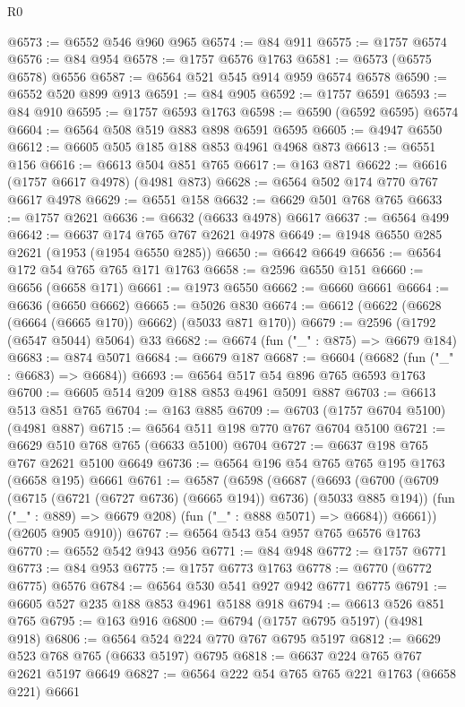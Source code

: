 \begin{lexlean}{R0}
\begin{coremodule}
{{{{{@6573 := @6552 @546 @960 @965
@6574 := @84 @911
@6575 := @1757 @6574
@6576 := @84 @954
@6578 := @1757 @6576 @1763
@6581 := @6573 (@6575 @6578) @6556
@6587 := @6564 @521 @545 @914 @959 @6574 @6578
@6590 := @6552 @520 @899 @913
@6591 := @84 @905
@6592 := @1757 @6591
@6593 := @84 @910
@6595 := @1757 @6593 @1763
@6598 := @6590 (@6592 @6595) @6574
@6604 := @6564 @508 @519 @883 @898 @6591 @6595
@6605 := @4947 @6550
@6612 := @6605 @505 @185 @188 @853 @4961 @4968 @873
@6613 := @6551 @156
@6616 := @6613 @504 @851 @765
@6617 := @163 @871
@6622 := @6616 (@1757 @6617 @4978) (@4981 @873)
@6628 := @6564 @502 @174 @770 @767 @6617 @4978
@6629 := @6551 @158
@6632 := @6629 @501 @768 @765
@6633 := @1757 @2621
@6636 := @6632 (@6633 @4978) @6617
@6637 := @6564 @499
@6642 := @6637 @174 @765 @767 @2621 @4978
@6649 := @1948 @6550 @285 @2621 (@1953 (@1954 @6550 @285))
@6650 := @6642 @6649
@6656 := @6564 @172 @54 @765 @765 @171 @1763
@6658 := @2596 @6550 @151
@6660 := @6656 (@6658 @171)
@6661 := @1973 @6550
@6662 := @6660 @6661
@6664 := @6636 (@6650 @6662)
@6665 := @5026 @830
@6674 := @6612 (@6622 (@6628 (@6664 (@6665 @170)) @6662) (@5033 @871 @170))
@6679 := @2596 (@1792 (@6547 @5044) @5064) @33
@6682 := @6674 (fun ("_" : @875) => @6679 @184)
@6683 := @874 @5071
@6684 := @6679 @187
@6687 := @6604 (@6682 (fun ("_" : @6683) => @6684))
@6693 := @6564 @517 @54 @896 @765 @6593 @1763
@6700 := @6605 @514 @209 @188 @853 @4961 @5091 @887
@6703 := @6613 @513 @851 @765
@6704 := @163 @885
@6709 := @6703 (@1757 @6704 @5100) (@4981 @887)
@6715 := @6564 @511 @198 @770 @767 @6704 @5100
@6721 := @6629 @510 @768 @765 (@6633 @5100) @6704
@6727 := @6637 @198 @765 @767 @2621 @5100 @6649
@6736 := @6564 @196 @54 @765 @765 @195 @1763 (@6658 @195) @6661
@6761 := @6587
    (@6598
      (@6687
        (@6693
          (@6700
            (@6709 (@6715 (@6721 (@6727 @6736) (@6665 @194)) @6736) (@5033 @885 @194))
            (fun ("_" : @889) => @6679 @208)
            (fun ("_" : @888 @5071) => @6684))
          @6661))
      (@2605 @905 @910))
@6767 := @6564 @543 @54 @957 @765 @6576 @1763
@6770 := @6552 @542 @943 @956
@6771 := @84 @948
@6772 := @1757 @6771
@6773 := @84 @953
@6775 := @1757 @6773 @1763
@6778 := @6770 (@6772 @6775) @6576
@6784 := @6564 @530 @541 @927 @942 @6771 @6775
@6791 := @6605 @527 @235 @188 @853 @4961 @5188 @918
@6794 := @6613 @526 @851 @765
@6795 := @163 @916
@6800 := @6794 (@1757 @6795 @5197) (@4981 @918)
@6806 := @6564 @524 @224 @770 @767 @6795 @5197
@6812 := @6629 @523 @768 @765 (@6633 @5197) @6795
@6818 := @6637 @224 @765 @767 @2621 @5197 @6649
@6827 := @6564 @222 @54 @765 @765 @221 @1763 (@6658 @221) @6661
}}}}}
\end{coremodule}
\end{lexlean}
